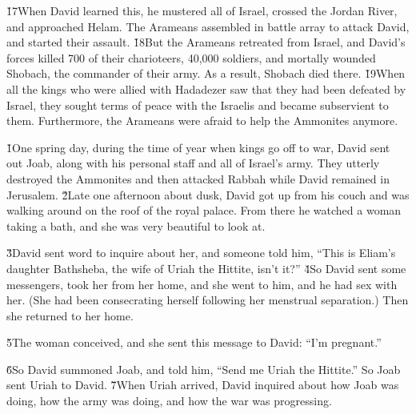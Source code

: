 \v{17}When David learned this, he mustered all of Israel, crossed the Jordan River, and approached Helam. The Arameans assembled in battle array to attack David, and started their assault. \v{18}But the Arameans retreated from Israel, and David's forces killed 700 of their charioteers, 40,000 soldiers, and mortally wounded Shobach, the commander of their army. As a result, Shobach died there. \v{19}When all the kings who were allied with Hadadezer saw that they had been defeated by Israel, they sought terms of peace with the Israelis and became subservient to them. Furthermore, the Arameans were afraid to help the Ammonites anymore.

\v{1}One spring day, during the time of year when kings go off to war, David sent out Joab, along with his personal staff and all of Israel's army. They utterly destroyed the Ammonites and then attacked Rabbah while David remained in Jerusalem. \v{2}Late one afternoon about dusk, David got up from his couch and was walking around on the roof of the royal palace. From there he watched a woman taking a bath, and she was very beautiful to look at.

\v{3}David sent word to inquire about her, and someone told him, ``This is Eliam's daughter Bathsheba, the wife of Uriah the Hittite, isn't it?'' \v{4}So David sent some messengers, took her from her home, and she went to him, and he had sex with her. (She had been consecrating herself following her menstrual separation.) Then she returned to her home.

\v{5}The woman conceived, and she sent this message to David: ``I'm pregnant.''

\v{6}So David summoned Joab, and told him, ``Send me Uriah the Hittite.'' So Joab sent Uriah to David. \v{7}When Uriah arrived, David inquired about how Joab was doing, how the army was doing, and how the war was progressing.

